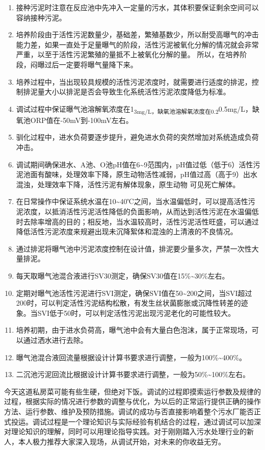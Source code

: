\documentclass[]{book}
\begin{document}
\begin{enumerate}
\def\labelenumi{(\arabic{enumi})}
\item
  接种污泥时注意在反应池中先冲入一定量的污水，其体积要保证剩余空间可以容纳接种污泥。
\item
  培养阶段由于活性污泥数量少，基础差，繁殖基数少，所以耐受高曝气的冲击能力差，如果一直处于足量曝气的阶段，活性污泥被氧化分解的情况就会非常严重，以至于活性污泥繁殖的量抵不上被氧化分解的量。 所以，在培养阶段，闷曝过后一定要将曝气量降下来。
\item
  培养过程中，当出现较具规模的活性污泥浓度时，就需要进行适度的排泥，控制排泥量大小以排泥是否会导致生化系统活性污泥浓度降低为标准。
\item
  调试过程中保证曝气池溶解氧浓度在1\textsubscript{3mg/L，缺氧池溶解氧浓度在0.2}0.5mg/L，缺氧池ORP值在-50mV到-100mV左右。
\item
  驯化过程中，进水负荷要逐步提升，避免进水负荷的突然增加对系统造成负荷冲击。
\item
  调试期间确保进水、A池、O池pH值在6\textasciitilde{}9范围内，pH值过低（低于6）活性污泥池面有酸味，处理效率下降，原生动物活性减弱，pH值过高（高于9）出水混浊，处理效率下降，活性污泥有解体现象，原生动物 可见死亡解体。
\item
  在日常操作中保证系统水温在10\textasciitilde{}40℃之间，当水温偏低时，可以提高活性污泥浓度，以抵消活性污泥活性降低的负面影响，从而达到活性污泥在水温偏低时去除率增高的目的；相反地，当水温较高时，活性污泥活性旺盛，可以通过降低活性污泥浓度来规避出现未沉降絮体和混浊的上清液的不良情况。
\item
  通过排泥将曝气池中污泥浓度控制在设计值，排泥要少量多次，严禁一次性大量排泥。
\item
  每天取曝气池混合液进行SV30测定，确保SV30值在15\%\textasciitilde{}30\%左右。
\item
  定期对曝气池活性污泥进行SVI测定，确保SVI值在50\textasciitilde{}200之间，当SVI超过200时，可以判定活性污泥结构松散，有发生丝状菌膨胀或沉降性转差的迹象。当SVI低于50时，可以判定活性污泥出现污泥老化的可能性较大。
\item
  培养初期，由于进水负荷高，曝气池中会有大量白色泡沫，属于正常现场，可以通过洒水进行去除。
\item
  曝气池混合液回流量根据设计计算书要求进行调整，一般为100\%\textasciitilde{}400\%。
\item
  二沉池污泥回流比根据设计计算书要求进行调整，一般为50\%\textasciitilde{}100\%左右。
\end{enumerate}

今天这道私房菜可能有些生硬，但绝对下饭。调试的过程即摸索运行参数及规律的过程，根据实际的情况进行参数的调整与优化，为以后的正常运行提供正确的操作方法、运行参数、维护及预防措施。调试的成功与否直接影响着整个污水厂能否正式投运。调试过程是一个理论知识与实际经验有机结合的过程，通过调试可以加深对理论知识的理解，同时可以用理论指导实践。对于刚刚踏入污水处理行业的新人，本人极力推荐大家深入现场，从调试开始，对未来的你收益无穷。
\end{document}
